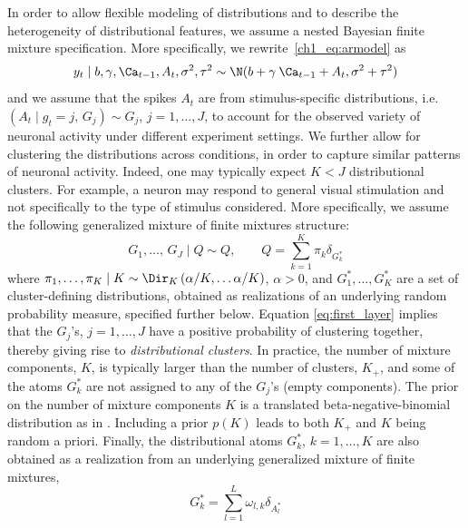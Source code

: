 In order to allow flexible modeling of distributions and to describe the heterogeneity of distributional features, we assume a nested Bayesian finite mixture specification. More specifically, we rewrite~\eqref{ch1_eq:armodel} as
\begin{equation*}
y_t\mid b, \gamma, \Ca_{t-1}, A_t, \sigma^2, \tau^2 \sim \N(b+\gamma\:\Ca_{t-1} + A_t, \sigma^2 + \tau^2 )
\end{equation*}
and we assume that the spikes $A_t$ are from stimulus-specific distributions, i.e. 
$ (A_t \mid g_t = j, \, G_j) \sim G_j$, $ j=1, \ldots, J$,
to account for the observed variety of neuronal activity under different experiment settings. We further allow for clustering the distributions across conditions, in order to capture similar patterns of neuronal activity. Indeed, one may typically expect $K<J$ distributional clusters. For example, a neuron may respond to general visual stimulation and not specifically to the type of stimulus considered. More specifically, we assume the following generalized mixture of finite mixtures structure:
%
\begin{equation}
G_1,\dots,\,G_J \mid Q \sim Q, \qquad Q = \sum_{k=1}^{K} \pi_k \delta_{G^*_k}
\label{eq:first_layer}
\end{equation}
where \(\pi_1,\dots,\pi_K \mid K \sim \Dir_K\left(\alpha/K, \ldots \alpha/K\right)\), $\alpha>0$, and $G_1^*, \ldots, G_K^*$ are a set of cluster-defining distributions, obtained as realizations of an underlying random probability measure, specified further below. Equation \eqref{eq:first_layer} implies that the $G_j$'s, $j=1,\ldots, J$ have a positive probability of clustering together, thereby giving rise to \textit{distributional clusters}. In practice, the number of mixture components, $K$, is typically larger than the number of clusters, $K_+$, and some of the atoms $G_k^*$ are not assigned to any of the $G_j$'s (empty components). The prior on the number of mixture components $K$ is a translated beta-negative-binomial distribution as in \citet{fruhwirthschnatter2020}. 
Including a prior $p(K)$ leads to both $K_+$ and $K$ being random a priori. 
Finally, the distributional atoms $G_k^*$, $k=1, \ldots, K$ are also obtained as a realization from an underlying generalized mixture of finite mixtures, 
\begin{equation}
G^*_k = \sum_{l=1}^{L} \omega_{l,k} \delta_{A^*_l}
\label{eq:second_layer}
\end{equation}
